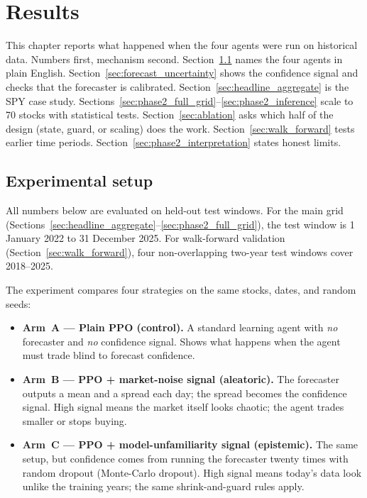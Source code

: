 \chapter{Results}
\label{ch:results}

This chapter reports what happened when the four agents were run on historical data. Numbers first, mechanism second. Section~\ref{sec:experimental_setup} names the four agents in plain English. Section~\ref{sec:forecast_uncertainty} shows the confidence signal and checks that the forecaster is calibrated. Section~\ref{sec:headline_aggregate} is the SPY case study. Sections~\ref{sec:phase2_full_grid}--\ref{sec:phase2_inference} scale to 70 stocks with statistical tests. Section~\ref{sec:ablation} asks which half of the design (state, guard, or scaling) does the work. Section~\ref{sec:walk_forward} tests earlier time periods. Section~\ref{sec:phase2_interpretation} states honest limits.

\section{Experimental setup}
\label{sec:experimental_setup}

All numbers below are evaluated on held-out test windows. For the main grid (Sections~\ref{sec:headline_aggregate}--\ref{sec:phase2_full_grid}), the test window is 1 January 2022 to 31 December 2025. For walk-forward validation (Section~\ref{sec:walk_forward}), four non-overlapping two-year test windows cover 2018--2025.

The experiment compares four strategies on the same stocks, dates, and random seeds:

\begin{itemize}[leftmargin=*]
  \item \textbf{Arm~A --- Plain PPO (control).} A standard learning agent with \emph{no} forecaster and \emph{no} confidence signal. Shows what happens when the agent must trade blind to forecast confidence.
  \item \textbf{Arm~B --- PPO + market-noise signal (aleatoric).} The forecaster outputs a mean and a spread each day; the spread becomes the confidence signal. High signal means the market itself looks chaotic; the agent trades smaller or stops buying.
  \item \textbf{Arm~C --- PPO + model-unfamiliarity signal (epistemic).} The same setup, but confidence comes from running the forecaster twenty times with random dropout (Monte-Carlo dropout). High signal means today's data look unlike the training years; the same shrink-and-guard rules apply.
\end{itemize}

